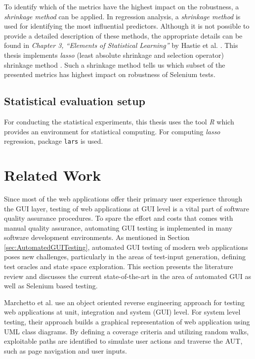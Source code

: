 To identify which of the metrics have the highest impact on the robustness, a \textit{shrinkage method} can be applied. In regression analysis, a \textit{shrinkage method} is used for identifying the most influential predictors. Although it is not possible to provide a detailed description of these methods, the appropriate details can be found in \textit{Chapter 3, ``Elements of Statistical Learning''} by Hastie et al. \cite{hastie01statisticallearning}. This thesis implements \textit{lasso} (least absolute shrinkage and selection operator) shrinkage method \cite{tibshirani1996regression}. Such a shrinkage method tells us which subset of the presented metrics has highest impact on robustness of Selenium tests.

\subsection*{Statistical evaluation setup}
For conducting the statistical experiments, this thesis uses the tool \textit{R} \cite{Rtool} which provides an environment for statistical computing. For computing \textit{lasso} regression, package \texttt{lars} \cite{larspack} is used. 
\section{Related Work}
\label{sec:relatedWork}

Since most of the web applications offer their primary user experience through the GUI layer, testing of web applications at GUI level is a vital part of software quality assurance procedures. To spare the effort and costs that comes with manual quality assurance, automating GUI testing is implemented in many software development environments. As mentioned in Section \ref{sec:AutomatedGUITesting}, automated GUI testing of modern web applications poses new challenges, particularly in the areas of test-input generation, defining test oracles and state space exploration. This section presents the literature review and discusses the current state-of-the-art in the area of automated GUI as well as Selenium\cite{websiteSelenium} based testing. 

Marchetto et al.\cite{Marchetto2006} use an object oriented reverse engineering approach for testing web applications at unit, integration and system (GUI) level. For system level testing, their approach builds a graphical representation of web application using UML class diagrams. By defining a coverage criteria and utilizing random walks, exploitable paths are identified to simulate user actions and traverse the AUT, such as page navigation and user inputs.

